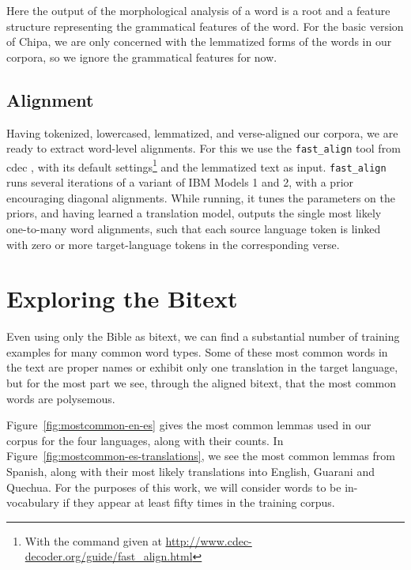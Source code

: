 Here the output of the morphological analysis of a word is a root and a feature
structure representing the grammatical features of the word.  For the basic
version of Chipa, we are only concerned with the lemmatized forms of the words
in our corpora, so we ignore the grammatical features for now.

\subsection{Alignment}
Having tokenized, lowercased, lemmatized, and verse-aligned our corpora, we
are ready to extract word-level alignments.
For this we use the \texttt{fast\_align} tool from cdec
\cite{dyer-EtAl:2010:Demos}, with its default settings\footnote{With the
command given at \url{http://www.cdec-decoder.org/guide/fast_align.html}} and
the lemmatized text as input.
\texttt{fast\_align} runs several iterations of a variant of IBM
Models 1 and 2, with a prior encouraging diagonal alignments. While running, it
tunes the parameters on the priors, and having learned a translation model,
outputs the single most likely one-to-many word alignments, such that each
source language token is linked with zero or more target-language tokens in the
corresponding verse.


\section{Exploring the Bitext}
Even using only the Bible as bitext, we can find a substantial number of
training examples for many common word types. Some of these most common words
in the text are proper names or exhibit only one translation in the target
language, but for the most part we see, through the aligned bitext, that
the most common words are polysemous.

Figure~\ref{fig:mostcommon-en-es} gives the most common lemmas used in our
corpus for the four languages, along with their counts. In
Figure~\ref{fig:mostcommon-es-translations}, we see the most common lemmas from
Spanish, along with their most likely translations into English, Guarani and
Quechua. For the purposes of this work, we will consider words to be
in-vocabulary if they appear at least fifty times in the training corpus.


